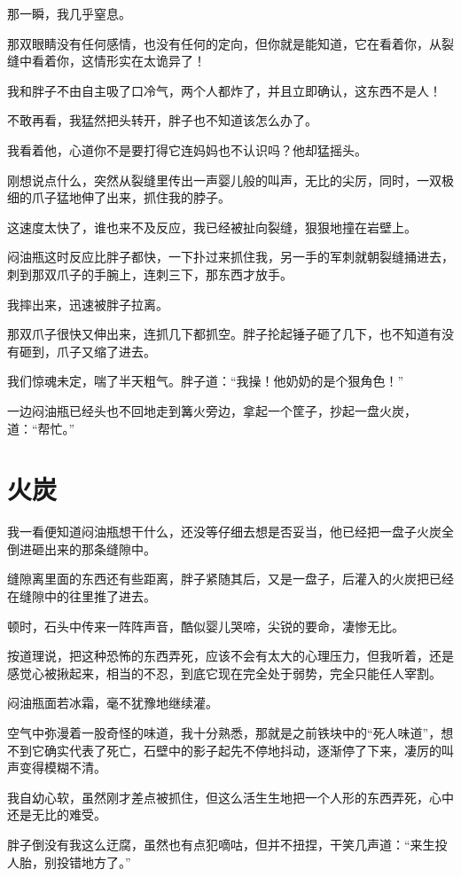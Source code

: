 那一瞬，我几乎窒息。

那双眼睛没有任何感情，也没有任何的定向，但你就是能知道，它在看着你，从裂缝中看着你，这情形实在太诡异了！

我和胖子不由自主吸了口冷气，两个人都炸了，并且立即确认，这东西不是人！

不敢再看，我猛然把头转开，胖子也不知道该怎么办了。

我看着他，心道你不是要打得它连妈妈也不认识吗？他却猛摇头。

刚想说点什么，突然从裂缝里传出一声婴儿般的叫声，无比的尖厉，同时，一双极细的爪子猛地伸了出来，抓住我的脖子。

这速度太快了，谁也来不及反应，我已经被扯向裂缝，狠狠地撞在岩壁上。

闷油瓶这时反应比胖子都快，一下扑过来抓住我，另一手的军刺就朝裂缝捅进去，刺到那双爪子的手腕上，连刺三下，那东西才放手。

我摔出来，迅速被胖子拉离。

那双爪子很快又伸出来，连抓几下都抓空。胖子抡起锤子砸了几下，也不知道有没有砸到，爪子又缩了进去。

我们惊魂未定，喘了半天粗气。胖子道：“我操！他奶奶的是个狠角色！”

一边闷油瓶已经头也不回地走到篝火旁边，拿起一个筐子，抄起一盘火炭，道：“帮忙。”

\chapter{火炭}

我一看便知道闷油瓶想干什么，还没等仔细去想是否妥当，他已经把一盘子火炭全倒进砸出来的那条缝隙中。

缝隙离里面的东西还有些距离，胖子紧随其后，又是一盘子，后灌入的火炭把已经在缝隙中的往里推了进去。

顿时，石头中传来一阵阵声音，酷似婴儿哭啼，尖锐的要命，凄惨无比。

按道理说，把这种恐怖的东西弄死，应该不会有太大的心理压力，但我听着，还是感觉心被揪起来，相当的不忍，到底它现在完全处于弱势，完全只能任人宰割。

闷油瓶面若冰霜，毫不犹豫地继续灌。

空气中弥漫着一股奇怪的味道，我十分熟悉，那就是之前铁块中的“死人味道”，想不到它确实代表了死亡，石壁中的影子起先不停地抖动，逐渐停了下来，凄厉的叫声变得模糊不清。

我自幼心软，虽然刚才差点被抓住，但这么活生生地把一个人形的东西弄死，心中还是无比的难受。

胖子倒没有我这么迂腐，虽然也有点犯嘀咕，但并不扭捏，干笑几声道：“来生投人胎，别投错地方了。”

